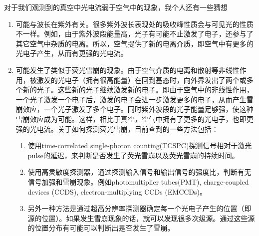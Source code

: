 \documentclass[english]{ctexart}
\begin{document}
对于我们观测到的真空中光电流弱于空气中的现象，我个人还有一些猜想
\begin{enumerate}
\item 可能与波长在紫外有关。很多紫外波长表现处的吸收峰性质会与可见光的性质不一样。例如，由于紫外波段能量高，光子有可能不止激发了电子，还参与了其它空气中杂质的电离。所以，空气提供了新的电离介质，即空气中有更多的光电子产生，从而有更强的光电流。
\item 可能发生了类似于荧光雪崩的现象。由于空气介质的电离和散射等非线性作用，被激发的光电子（拥有很高能量）在回到基态时，向外界发出了两个或多个新的光子。这些新的光子继续激发新的电子。即由于空气中的非线性作用，一个光子激发一个电子后，激发的电子会进一步激发更多的电子，从而产生雪崩效应，一个光子激发了多个电子。同时紫外波段的光子能量足够强，使这种雪崩效应成为可能。这样，相比于真空，空气中拥有了更多的光电子，也即更强的光电流。关于如何探测荧光雪崩，目前查到的一些方法包括：
\begin{enumerate}
\item 使用time-correlated single-photon counting(TCSPC)探测信号相对于激光pulse的延迟，来判断是否发生了荧光雪崩以及荧光雪崩的持续时间。
\item 使用高灵敏度探测器，通过探测输入信号和输出信号的强度比，判断有无信号加强和雪崩现象。例如photomultiplier tubes(PMT),
charge-coupled devices (CCDS), electron-multiplying CCDs (EMCCDs)。
\item 另外一种方法是通过超高分辨率探测器确定每一个光电子产生的位置（即源的位置）。如果发生雪崩现象的话，就可以发现很多次级源。通过这些源的位置分布有可能可以判断出是否发生了雪崩。
\end{enumerate}
\end{enumerate}
\end{document}
